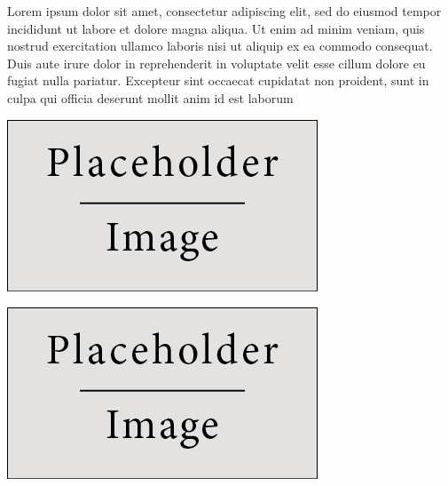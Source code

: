 \documentclass[a0,portrait]{a0poster}
\begin{document}
\begin{minipage}[c]{\linewidth}
\begin{framed}
\begin{multicols}{2}
Lorem ipsum dolor sit amet, consectetur adipiscing elit, sed do eiusmod tempor incididunt ut labore et dolore magna aliqua. Ut enim ad minim veniam, quis nostrud exercitation ullamco laboris nisi ut aliquip ex ea commodo consequat. Duis aute irure dolor in reprehenderit in voluptate velit esse cillum dolore eu fugiat nulla pariatur. Excepteur sint occaecat cupidatat non proident, sunt in culpa qui officia deserunt mollit anim id est laborum
\begin{center}
\includegraphics[width=0.6\linewidth]{figures/placeholder}
\label{GIMupdown}
\end{center}
\vspace{0.1cm}
\begin{center}
\includegraphics[width=0.6\linewidth]{figures/placeholder}
\label{GIMlatlon}
\end{center}
\color{Black}

\end{multicols}
\end{framed}
\end{minipage}
\end{document}
